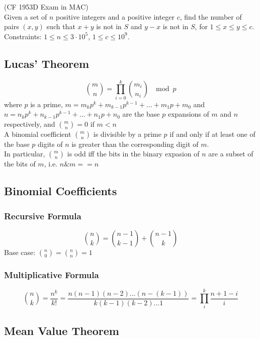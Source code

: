 \documentclass[12pt]{extarticle}
\begin{document}
\noindent (CF 1953D Exam in MAC)\\
Given a set of $n$ positive integers and a positive integer $c$, find the number of pairs $(x,y)$ such that $x+y$ is not in $S$ and $y-x$ is not in $S$, for $1\leq x\leq y\leq c$. Constraints: $1\leq n\leq 3\cdot 10^{5}$, $1\leq c\leq 10^{9}$.

\subsection*{Lucas' Theorem}
$${m\choose n}=\prod_{i=0}^{k}{m_{i}\choose n_{i}}\;\mod p$$
where $p$ is a prime, $m=m_{k}p^{k}+m_{k-1}p^{k-1}+\dots+m_{1}p+m_{0}$ and $n=n_{k}p^{k}+n_{k-1}p^{k-1}+\dots+n_{1}p+n_{0}$ are the base $p$ expansions of $m$ and $n$ respectively, and ${m\choose n}=0$ if $m<n$\\
A binomial coefficient $m\choose n$ is divisible by a prime $p$ if and only if at least one of the base $p$ digits of $n$ is greater than the corresponding digit of $m$.\\
In particular, $m\choose n$ is odd iff the bits in the binary expasion of $n$ are a subset of the bits of $m$, i.e. $n\&m==n$
\subsection*{Binomial Coefficients}
\subsubsection*{Recursive Formula}
$${n\choose k}={n-1\choose k-1}+{n-1\choose k}$$
Base case: ${n\choose 0}={n\choose n}=1$
\subsubsection*{Multiplicative Formula}
$${n\choose k}=\frac{n^{\underline{k}}}{k!}=\frac{n(n-1)(n-2)\dots(n-(k-1))}{k(k-1)(k-2)\dots 1}=\prod_{i}^{k}\frac{n+1-i}{i}$$
\subsection*{Mean Value Theorem}
\end{document}
